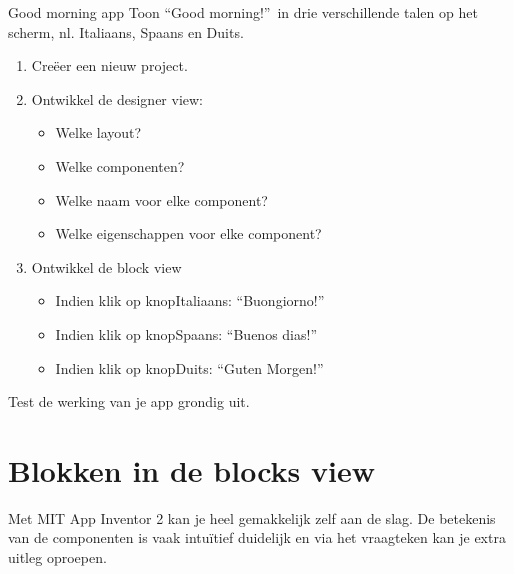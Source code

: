 \begin{opdracht}{Good morning app}
	Toon \textquotedblleft Good morning!\textquotedblright \ in drie verschillende talen op het scherm, nl. Italiaans, Spaans en Duits.
	
	\begin{minipage}{.5\linewidth}
	\end{minipage}
	\begin{minipage}{.5\linewidth}
		\begin{enumerate}
			\item Cre\"eer een nieuw project.
			\item Ontwikkel de designer view:
			\begin{itemize}
				\item Welke layout?
				\item Welke componenten?
				\item Welke naam voor elke component?
				\item Welke eigenschappen voor elke component?
			\end{itemize}
			\item Ontwikkel de block view
			\begin{itemize}
				\item Indien klik op knopItaliaans: \textquotedblleft Buongiorno!\textquotedblright
				\item Indien klik op knopSpaans: \textquotedblleft Buenos dias!\textquotedblright
				\item Indien klik op knopDuits: \textquotedblleft Guten Morgen!\textquotedblright
			\end{itemize}
		\end{enumerate}
	\end{minipage}

Test de werking van je app grondig uit.

\end{opdracht}

\section{Blokken in de blocks view}
\label{sec:Mod2_Sec2}
%
Met MIT App Inventor 2 kan je heel gemakkelijk zelf aan de slag. De betekenis van de componenten is vaak intu\"itief duidelijk en via het vraagteken kan je extra uitleg oproepen. 

